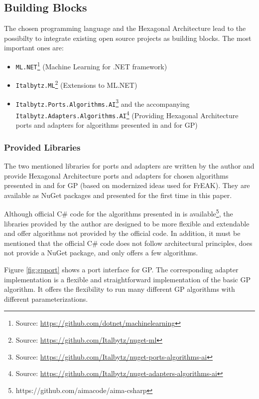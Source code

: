 \documentclass[dvipsnames,format=sigconf,anonymous=false,review=false]{acmart}
\begin{document}
\subsection{Building Blocks}

The chosen programming language and the Hexagonal Architecture lead to the possibilty to integrate existing open source projects as building blocks. The most important ones are:

\begin{itemize}
  \item \texttt{ML.NET}\footnote{Source: \url{https://github.com/dotnet/machinelearning}} (Machine Learning for .NET framework)
  \item \texttt{Italbytz.ML}\footnote{Source: \url{https://github.com/Italbytz/nuget-ml}} (Extensions to ML.NET) 
  \item \texttt{Italbytz.Ports.Algorithms.AI}\footnote{Source: \url{https://github.com/Italbytz/nuget-ports-algorithms-ai}} and the accompanying \texttt{Italbytz.Adapters.Algorithms.AI}\footnote{Source: \url{https://github.com/Italbytz/nuget-adapters-algorithms-ai}} (Providing Hexagonal Architecture ports and adapters for algorithms presented in \citet{russel2020} and for GP)   
\end{itemize}

\subsubsection{Provided Libraries}

The two mentioned libraries for ports and adapters are written by the author and provide Hexagonal Architecture ports and adapters for chosen algorithms presented in \citet{russel2020} and for GP (based on modernized ideas used for FrEAK). They are available as NuGet packages and presented for the first time in this paper.

Although official C\# code for the algorithms presented in \citet{russel2020} is available\footnote{https://github.com/aimacode/aima-csharp}, the libraries provided by the author are designed to be more flexible and extendable and offer algorithms not provided by the official code. In addition, it must be mentioned that the official C\# code does not follow architectural principles, does not provide a NuGet package, and only offers a few algorithms.


Figure \ref{fig:gpport} shows a port interface for GP. The corresponding adapter implementation is a flexible and straightforward implementation of the basic GP algorithm. It offers the flexibility to run many different GP algorithms with different parameterizations. 
\end{document}
